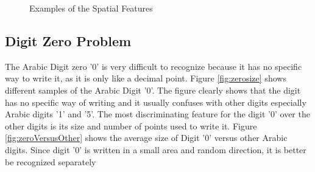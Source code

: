 \documentclass[times, 10pt,twocolumn]{article}
\begin{document}
\begin{figure}[h]
\centering
 \caption{Examples of the Spatial Features}
 \label{fig:features}
\end{figure}


\subsection{Digit Zero Problem}
\label{sec:ZeroProblem}



The Arabic Digit zero '0' is very difficult to recognize because it has no specific way to write it, as it is only like a decimal point. Figure \ref{fig:zerosize} shows different samples of the Arabic Digit '0'. The figure clearly shows that the digit has no specific way of writing  and it usually confuses with other digits especially Arabic digits '1' and '5'. The most discriminating feature for the digit '0' over the other digits is its size and number of points used to write it. Figure \ref{fig:zeroVersusOther} shows the average size of Digit '0' versus other Arabic digits. Since digit '0' is written in a small area and random direction, it is better be recognized separately



  
  
\end{document}
